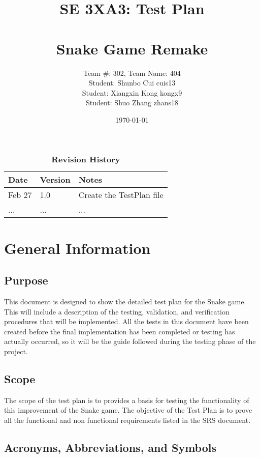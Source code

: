 \documentclass[12pt, titlepage]{article}
\title{SE 3XA3: Test Plan\\\\\textbf{Snake Game Remake}}
\author{Team \#: 302, Team Name: 404
		\\ Student: Shunbo Cui	cuis13
		\\ Student: Xiangxin Kong	kongx9
		\\ Student: Shuo Zhang	zhans18
}
\date{\today}
\begin{document}
\maketitle

\tableofcontents
\listoftables
\listoffigures

\begin{table}[bp]
\caption{\bf Revision History}
\begin{tabularx}{\textwidth}{p{3cm}p{2cm}X}
\toprule {\bf Date} & {\bf Version} & {\bf Notes}\\
\midrule
Feb 27 & 1.0 & Create the TestPlan file\\
... & ... & ...\\
\bottomrule
\end{tabularx}
\end{table}

\newpage




\section{General Information}         

\subsection{Purpose}
This document is designed to show the detailed test plan for the Snake game. This will include a description of the testing, validation, and verification procedures that will be implemented. All the tests in this document have been created before the final implementation has been completed or testing has actually occurred, so it will be the guide followed during the testing phase of the project.

\subsection{Scope}
The scope of the test plan is to provides a basis for testing the functionality of this improvement of the Snake game. The objective of the Test Plan is to prove all the functional and non functional requirements listed in the SRS document.


\subsection{Acronyms, Abbreviations, and Symbols}
\end{document}
